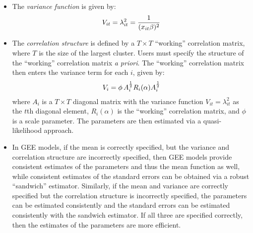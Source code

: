 \documentclass[letterpaper,10pt,english]{sphinxmanual}
\begin{document}
\begin{itemize}
\item {} 
The \emph{variance function} is given by:
\begin{gather}
\begin{split}V_{it} = \lambda_{it}^2 = \frac{1}{(x_{it} \beta)^2}\end{split}\notag
\end{gather}
\item {} 
The \emph{correlation structure} is defined by a \(T \times T\)
“working” correlation matrix, where \(T\) is the size of the
largest cluster. Users must specify the structure of the “working”
correlation matrix \emph{a priori}. The “working” correlation matrix then
enters the variance term for each \(i\), given by:
\begin{gather}
\begin{split}V_{i} = \phi \, A_{i}^{\frac{1}{2}} R_{i}(\alpha) A_{i}^{\frac{1}{2}}\end{split}\notag
\end{gather}
where \(A_{i}\) is a \(T \times T\) diagonal matrix with the
variance function \(V_{it} = \lambda_{it}^2\) as the
\(t\)th diagonal element, \(R_{i}(\alpha)\) is the
“working” correlation matrix, and \(\phi\) is a scale parameter.
The parameters are then estimated via a quasi-likelihood approach.

\item {} 
In GEE models, if the mean is correctly specified, but the variance
and correlation structure are incorrectly specified, then GEE models
provide consistent estimates of the parameters and thus the mean
function as well, while consistent estimates of the standard errors
can be obtained via a robust “sandwich” estimator. Similarly, if the
mean and variance are correctly specified but the correlation
structure is incorrectly specified, the parameters can be estimated
consistently and the standard errors can be estimated consistently
with the sandwich estimator. If all three are specified correctly,
then the estimates of the parameters are more efficient.

\end{itemize}
\end{document}
